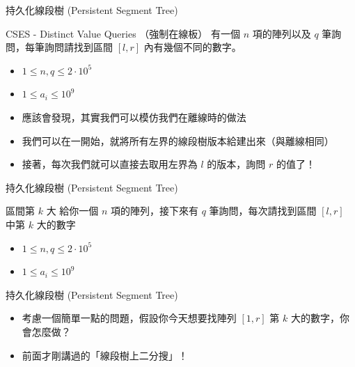 \documentclass[aspectratio=169]{beamer}
\begin{document}
    \begin{frame}{持久化線段樹 (Persistent Segment Tree)}
        \begin{block}{CSES - Distinct Value Queries （強制在線板）}
            有一個 $n$ 項的陣列以及 $q$ 筆詢問，每筆詢問請找到區間 $[l,r]$ 內有幾個不同的數字。 \\
            \vspace{0.5cm}
            \begin{itemize}
                \item $1 \le n,q \le 2 \cdot 10^5$
                \item $1 \le a_i \le 10^9$
            \end{itemize}
        \end{block}
        \begin{itemize}
            \item<2-> 應該會發現，其實我們可以模仿我們在離線時的做法
            \item<3-> 我們可以在一開始，就將所有左界的線段樹版本給建出來（與離線相同）
            \item<4-> 接著，每次我們就可以直接去取用左界為 $l$ 的版本，詢問 $r$ 的值了！
        \end{itemize}
    \end{frame}

    \begin{frame}{持久化線段樹 (Persistent Segment Tree)}
        \begin{block}{區間第 $k$ 大}
            給你一個 $n$ 項的陣列，接下來有 $q$ 筆詢問，每次請找到區間 $[l,r]$ 中第 $k$ 大的數字\\
            \vspace{0.5cm}
            \begin{itemize}
                \item $1 \le n,q \le 2 \cdot 10^5$
                \item $1 \le a_i \le 10^9$
            \end{itemize}
        \end{block}
    \end{frame}

    \begin{frame}{持久化線段樹 (Persistent Segment Tree)}
        \begin{itemize}
            \item 考慮一個簡單一點的問題，假設你今天想要找陣列 $[1,r]$ 第 $k$ 大的數字，你會怎麼做？
            \item<2-> 前面才剛講過的「線段樹上二分搜」！
        \end{itemize}
    \end{frame}
\end{document}
